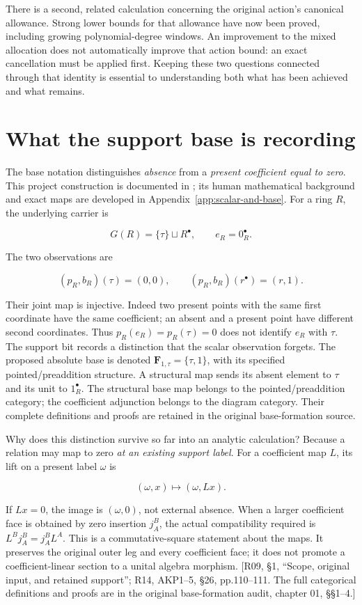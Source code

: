 There is a second, related calculation concerning the original action's canonical allowance. Strong lower bounds for that allowance have now been proved, including growing polynomial-degree windows. An improvement to the mixed allocation does not automatically improve that action bound: an exact cancellation must be applied first. Keeping these two questions connected through that identity is essential to understanding both what has been achieved and what remains.

\section{What the support base is recording}\label{what-the-support-base-is-recording}

The base notation distinguishes \emph{absence} from a \emph{present coefficient equal to zero}. This project construction is documented in \cite{GlobalizationNote2026,SplitZeroSecondary2026}; its human mathematical background and exact maps are developed in Appendix~\ref{app:scalar-and-base}. For a ring \(R\), the underlying carrier is

\[
G(R)=\{\tau\}\sqcup R^\bullet,\qquad e_R=0_R^\bullet.
\]

The two observations are

\[
(p_R,b_R)(\tau)=(0,0),\qquad
(p_R,b_R)(r^\bullet)=(r,1).
\]

Their joint map is injective. Indeed two present points with the same first coordinate have the same coefficient; an absent and a present point have different second coordinates. Thus \(p_R(e_R)=p_R(\tau)=0\) does not identify \(e_R\) with \(\tau\). The support bit records a distinction that the scalar observation forgets. The proposed absolute base is denoted \(\mathbf F_{1,\tau}=\{\tau,1\}\), with its specified pointed/preaddition structure. A structural map sends its absent element to \(\tau\) and its unit to \(1_R^\bullet\). The structural base map belongs to the pointed/preaddition category; the coefficient adjunction belongs to the diagram category. Their complete definitions and proofs are retained in the original base-formation source.

Why does this distinction survive so far into an analytic calculation? Because a relation may map to zero \emph{at an existing support label}. For a coefficient map \(L\), its lift on a present label \(\omega\) is

\[
(\omega,x)\longmapsto(\omega,Lx).
\]

If \(Lx=0\), the image is \((\omega,0)\), not external absence. When a larger coefficient face is obtained by zero insertion \(j_A^B\), the actual compatibility required is \(L^B j_A^B=j_A^B L^A\). This is a commutative-square statement about the maps. It preserves the original outer leg and every coefficient face; it does not promote a coefficient-linear section to a unital algebra morphism. {[}R09, §1, ``Scope, original input, and retained support''; R14, AKP1--5, §26, pp.110--111. The full categorical definitions and proofs are in the original base-formation audit, chapter 01, §§1--4.{]}


